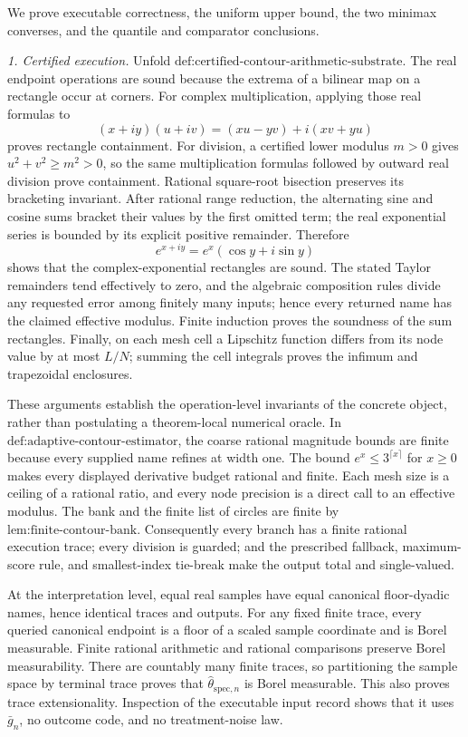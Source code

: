 We prove executable correctness, the uniform upper bound, the two minimax converses, and the quantile and comparator conclusions.

\emph{1. Certified execution.}  Unfold \(\text{def:certified-contour-arithmetic-substrate}\).  The real endpoint operations are sound because the extrema of a bilinear map on a rectangle occur at corners.  For complex multiplication, applying those real formulas to
\[
 (x+iy)(u+iv)=(xu-yv)+i(xv+yu)
\]
proves rectangle containment.  For division, a certified lower modulus \(m>0\) gives \(u^2+v^2\ge m^2>0\), so the same multiplication formulas followed by outward real division prove containment.  Rational square-root bisection preserves its bracketing invariant.  After rational range reduction, the alternating sine and cosine sums bracket their values by the first omitted term; the real exponential series is bounded by its explicit positive remainder.  Therefore
\[
 e^{x+iy}=e^x(\cos y+i\sin y)
\]
shows that the complex-exponential rectangles are sound.  The stated Taylor remainders tend effectively to zero, and the algebraic composition rules divide any requested error among finitely many inputs; hence every returned name has the claimed effective modulus.  Finite induction proves the soundness of the sum rectangles.  Finally, on each mesh cell a Lipschitz function differs from its node value by at most \(L/N\); summing the cell integrals proves the infimum and trapezoidal enclosures.

These arguments establish the operation-level invariants of the concrete object, rather than postulating a theorem-local numerical oracle.  In \(\text{def:adaptive-contour-estimator}\), the coarse rational magnitude bounds are finite because every supplied name refines at width one.  The bound \(e^x\le3^{\lceil x\rceil}\) for \(x\ge0\) makes every displayed derivative budget rational and finite.  Each mesh size is a ceiling of a rational ratio, and every node precision is a direct call to an effective modulus.  The bank and the finite list of circles are finite by \(\text{lem:finite-contour-bank}\).  Consequently every branch has a finite rational execution trace; every division is guarded; and the prescribed fallback, maximum-score rule, and smallest-index tie-break make the output total and single-valued.

At the interpretation level, equal real samples have equal canonical floor-dyadic names, hence identical traces and outputs.  For any fixed finite trace, every queried canonical endpoint is a floor of a scaled sample coordinate and is Borel measurable.  Finite rational arithmetic and rational comparisons preserve Borel measurability.  There are countably many finite traces, so partitioning the sample space by terminal trace proves that \(\widehat\theta_{\mathrm{spec},n}\) is Borel measurable.  This also proves trace extensionality.  Inspection of the executable input record shows that it uses \(\bar g_n\), no outcome code, and no treatment-noise law.

